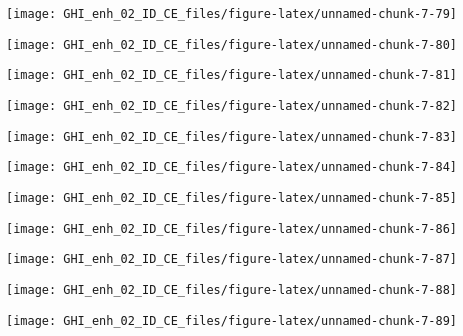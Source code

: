 \documentclass[
  10pt,
  a4paper,oneside]{article}
\begin{document}
\begin{center}\texttt{[image: GHI\_enh\_02\_ID\_CE\_files/figure-latex/unnamed-chunk-7-79]} \end{center}

\begin{center}\texttt{[image: GHI\_enh\_02\_ID\_CE\_files/figure-latex/unnamed-chunk-7-80]} \end{center}

\begin{center}\texttt{[image: GHI\_enh\_02\_ID\_CE\_files/figure-latex/unnamed-chunk-7-81]} \end{center}

\begin{center}\texttt{[image: GHI\_enh\_02\_ID\_CE\_files/figure-latex/unnamed-chunk-7-82]} \end{center}

\begin{center}\texttt{[image: GHI\_enh\_02\_ID\_CE\_files/figure-latex/unnamed-chunk-7-83]} \end{center}

\begin{center}\texttt{[image: GHI\_enh\_02\_ID\_CE\_files/figure-latex/unnamed-chunk-7-84]} \end{center}

\begin{center}\texttt{[image: GHI\_enh\_02\_ID\_CE\_files/figure-latex/unnamed-chunk-7-85]} \end{center}

\begin{center}\texttt{[image: GHI\_enh\_02\_ID\_CE\_files/figure-latex/unnamed-chunk-7-86]} \end{center}

\begin{center}\texttt{[image: GHI\_enh\_02\_ID\_CE\_files/figure-latex/unnamed-chunk-7-87]} \end{center}

\begin{center}\texttt{[image: GHI\_enh\_02\_ID\_CE\_files/figure-latex/unnamed-chunk-7-88]} \end{center}

\begin{center}\texttt{[image: GHI\_enh\_02\_ID\_CE\_files/figure-latex/unnamed-chunk-7-89]} \end{center}
\end{document}
